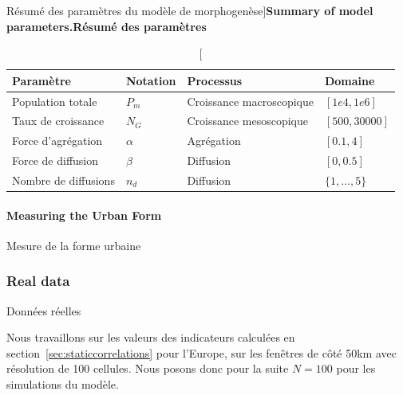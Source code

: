 \begin{table}[!ht]
\caption[Summary of model parameters][Résumé des paramètres du modèle de morphogenèse]{\textbf{Summary of model parameters.}\label{tab:density:parameters}}{\textbf{Résumé des paramètres}\label{tab:density:parameters}}
\begin{tabular}{|l|l|l|l|}
\hline
Paramètre & Notation & Processus & Domaine\\ \hline
Population totale & $P_m$ & Croissance macroscopique & $[1e4,1e6]$\\ \hline
Taux de croissance & $N_G$ & Croissance mesoscopique  & $[500,30000]$\\ \hline
Force d'agrégation & $\alpha$ & Agrégation & $[0.1,4]$\\ \hline
Force de diffusion & $\beta$ & Diffusion & $[0,0.5]$\\ \hline
Nombre de diffusions & $n_d$ & Diffusion & $\{1,\ldots , 5\}$\\ \hline
\end{tabular}
\end{table}


\paragraph{Measuring the Urban Form}{Mesure de la forme urbaine}



\subsubsection{Real data}{Données réelles}


Nous travaillons sur les valeurs des indicateurs calculées en section~\ref{sec:staticcorrelations} pour l'Europe, sur les fenêtres de côté 50km avec résolution de 100 cellules. Nous posons donc pour la suite $N=100$ pour les simulations du modèle.





